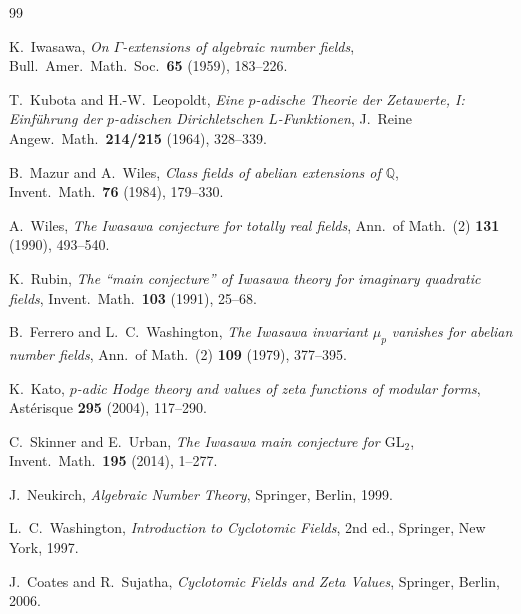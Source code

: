\documentclass[12pt,a4paper]{amsart}
\theoremstyle{definition}
\newcommand{\Q}{\mathbb{Q}}
\begin{document}
\begin{thebibliography}{99}

K.~Iwasawa,
\textit{On $\Gamma$-extensions of algebraic number fields},
Bull.\ Amer.\ Math.\ Soc.\ \textbf{65} (1959), 183--226.

T.~Kubota and H.-W.~Leopoldt,
\textit{Eine $p$-adische Theorie der Zetawerte, I: Einführung der $p$-adischen Dirichletschen $L$-Funktionen},
J.\ Reine Angew.\ Math.\ \textbf{214/215} (1964), 328--339.

B.~Mazur and A.~Wiles,
\textit{Class fields of abelian extensions of $\Q$},
Invent.\ Math.\ \textbf{76} (1984), 179--330.

A.~Wiles,
\textit{The Iwasawa conjecture for totally real fields},
Ann.\ of Math.\ (2) \textbf{131} (1990), 493--540.

K.~Rubin,
\textit{The ``main conjecture'' of Iwasawa theory for imaginary quadratic fields},
Invent.\ Math.\ \textbf{103} (1991), 25--68.

B.~Ferrero and L.~C.~Washington,
\textit{The Iwasawa invariant $\mu_p$ vanishes for abelian number fields},
Ann.\ of Math.\ (2) \textbf{109} (1979), 377--395.

K.~Kato,
\textit{$p$-adic Hodge theory and values of zeta functions of modular forms},
Ast\'erisque \textbf{295} (2004), 117--290.

C.~Skinner and E.~Urban,
\textit{The Iwasawa main conjecture for $\mathrm{GL}_2$},
Invent.\ Math.\ \textbf{195} (2014), 1--277.

J.~Neukirch,
\textit{Algebraic Number Theory},
Springer, Berlin, 1999.

L.~C.~Washington,
\textit{Introduction to Cyclotomic Fields},
2nd ed., Springer, New York, 1997.

J.~Coates and R.~Sujatha,
\textit{Cyclotomic Fields and Zeta Values},
Springer, Berlin, 2006.

\end{thebibliography}
\end{document}

